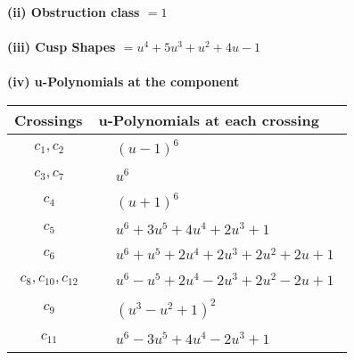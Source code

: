 \documentclass[1p]{elsarticle_modified}
\theoremstyle{definition}
\begin{document}
\flushleft \textbf{(ii) Obstruction class $= 1$}\\~\\
\flushleft \textbf{(iii) Cusp Shapes $= u^4+5 u^3+u^2+4 u-1$}\\~\\
\newpage\renewcommand{\arraystretch}{1}
\flushleft \textbf{(iv) u-Polynomials at the component}\newline \\
\begin{tabular}{m{50pt}|m{274pt}}
Crossings & \hspace{64pt}u-Polynomials at each crossing \\
\hline $$\begin{aligned}c_{1},c_{2}\end{aligned}$$&$\begin{aligned}
&(u-1)^6
\end{aligned}$\\
\hline $$\begin{aligned}c_{3},c_{7}\end{aligned}$$&$\begin{aligned}
&u^6
\end{aligned}$\\
\hline $$\begin{aligned}c_{4}\end{aligned}$$&$\begin{aligned}
&(u+1)^6
\end{aligned}$\\
\hline $$\begin{aligned}c_{5}\end{aligned}$$&$\begin{aligned}
&u^6+3 u^5+4 u^4+2 u^3+1
\end{aligned}$\\
\hline $$\begin{aligned}c_{6}\end{aligned}$$&$\begin{aligned}
&u^6+u^5+2 u^4+2 u^3+2 u^2+2 u+1
\end{aligned}$\\
\hline $$\begin{aligned}c_{8},c_{10},c_{12}\end{aligned}$$&$\begin{aligned}
&u^6- u^5+2 u^4-2 u^3+2 u^2-2 u+1
\end{aligned}$\\
\hline $$\begin{aligned}c_{9}\end{aligned}$$&$\begin{aligned}
&(u^3- u^2+1)^2
\end{aligned}$\\
\hline $$\begin{aligned}c_{11}\end{aligned}$$&$\begin{aligned}
&u^6-3 u^5+4 u^4-2 u^3+1
\end{aligned}$\\
\hline
\end{tabular}\\~\\
\end{document}

